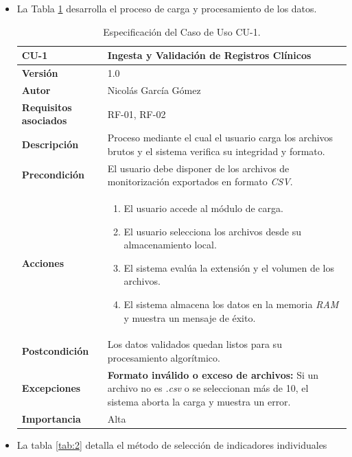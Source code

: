 \begin{itemize}
	\item La Tabla \ref{tab:1} desarrolla el proceso de carga y procesamiento de los datos.
	
\begin{table}[hbt!]	\centering
	\begin{tabularx}{\linewidth}{ p{} p{} }
		\toprule
		\textbf{CU-1}    & \textbf{Ingesta y Validación de Registros Clínicos}\\
		\toprule
		\textbf{Versión}              & 1.0    \\
		\textbf{Autor}                & Nicolás García Gómez \\
		\textbf{Requisitos asociados} & RF-01, RF-02 \\
		\textbf{Descripción}          & Proceso mediante el cual el usuario carga los archivos brutos y el sistema verifica su integridad y formato. \\
		\textbf{Precondición}         & El usuario debe disponer de los archivos de monitorización exportados en formato \textit{CSV}. \\
		\textbf{Acciones}             &
		\begin{enumerate}
			\def\labelenumi{\arabic{enumi}.}
			\item El usuario accede al módulo de carga.
			\item El usuario selecciona los archivos desde su almacenamiento local.
			\item El sistema evalúa la extensión y el volumen de los archivos.
			\item El sistema almacena los datos en la memoria \textit{RAM} y muestra un mensaje de éxito.
		\end{enumerate}\\
		\textbf{Postcondición}        & Los datos validados quedan listos para su procesamiento algorítmico. \\
		\textbf{Excepciones}          & \textbf{Formato inválido o exceso de archivos:} Si un archivo no es \textit{.csv} o se seleccionan más de 10, el sistema aborta la carga y muestra un error. \\
		\textbf{Importancia}          & Alta \\
		\bottomrule
	\end{tabularx}
	\caption{Especificación del Caso de Uso CU-1.}
	\label{tab:1}
\end{table}		
	
	\item La tabla \ref{tab:2} detalla el método de selección de indicadores individuales
	

\end{itemize}
